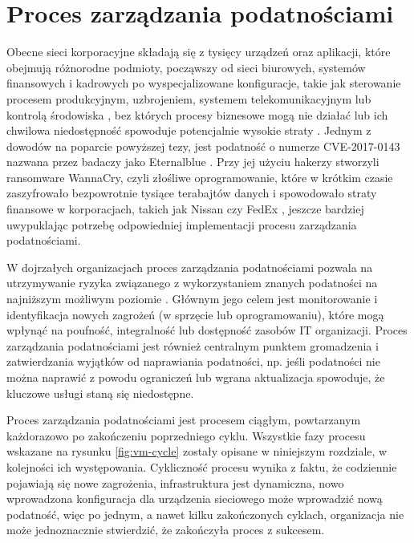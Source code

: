 \FloatBarrier

\section{Proces zarządzania podatnościami}
\label{sec:proces-zarzadzania-podatnosciami}
Obecne sieci korporacyjne składają się z tysięcy urządzeń oraz aplikacji, które obejmują różnorodne podmioty, począwszy od sieci biurowych, systemów finansowych i kadrowych po wyspecjalizowane konfiguracje, takie jak sterowanie procesem produkcyjnym, uzbrojeniem, systemem telekomunikacyjnym lub kontrolą środowiska \cite{al2019risk}, bez których procesy biznesowe mogą nie działać lub ich chwilowa niedostępność spowoduje potencjalnie wysokie straty \cite{nyanchama2005enterprise}. Jednym z dowodów na poparcie powyższej tezy, jest podatność o numerze CVE-2017-0143 nazwana przez badaczy jako Eternalblue \cite{cve-2017-0143}. Przy jej użyciu hakerzy stworzyli ransomware WannaCry, czyli złośliwe oprogramowanie, które w krótkim czasie zaszyfrowało bezpowrotnie tysiące terabajtów danych i spowodowało straty finansowe w korporacjach, takich jak Nissan czy FedEx \cite{mohurle2017brief, chen2017automated}, jeszcze bardziej uwypuklając potrzebę odpowiedniej implementacji procesu zarządzania podatnościami.

\bigbreak
W dojrzałych organizacjach proces zarządzania podatnościami pozwala na utrzymywanie ryzyka związanego z wykorzystaniem znanych podatności na najniższym możliwym poziomie \cite{walkowski2019container}. Głównym jego celem jest monitorowanie i identyfikacja nowych zagrożeń (w sprzęcie lub oprogramowaniu), które mogą wpłynąć na poufność, integralność lub dostępność zasobów IT organizacji. Proces zarządzania podatnościami jest również centralnym punktem gromadzenia i zatwierdzania wyjątków od naprawiania podatności, np. jeśli podatności nie można naprawić z powodu ograniczeń lub wgrana aktualizacja spowoduje, że kluczowe usługi staną się niedostępne.

\bigbreak
Proces zarządzania podatnościami jest procesem ciągłym, powtarzanym każdorazowo po zakończeniu poprzedniego cyklu. Wszystkie fazy procesu wskazane na rysunku \ref{fig:vm-cycle} zostały opisane w niniejszym rozdziale, w kolejności ich występowania. Cykliczność procesu wynika z faktu, że codziennie pojawiają się nowe zagrożenia, infrastruktura jest dynamiczna, nowo wprowadzona konfiguracja dla urządzenia sieciowego może wprowadzić nową podatność, więc po jednym, a nawet kilku zakończonych cyklach, organizacja nie może jednoznacznie stwierdzić, że zakończyła proces z sukcesem.

